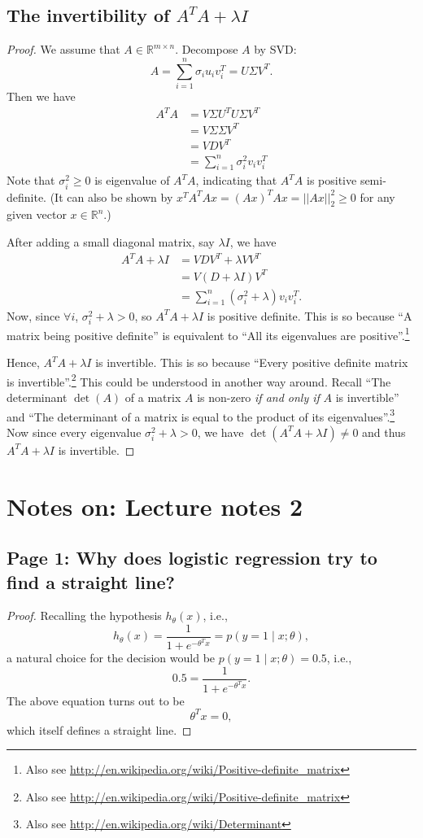 \documentclass{article}
\begin{document}
\subsection{The invertibility of $A^TA+\lambda I$}
\begin{proof}
We assume that $A\in\mathbb{R}^{m\times{n}}$. Decompose $A$ by SVD:
\[
A = \sum_{i=1}^n \sigma_i u_i v_i^T = U\Sigma V^T.
\]
Then we have
\[
\begin{split}
A^T A
&= V\Sigma U^T U\Sigma V^T\\
&= V\Sigma\Sigma V^T\\
&= VDV^T\\
&= \sum_{i=1}^n \sigma_i^2 v_i v_i^T
\end{split}
\]
Note that $\sigma_i^2\geq 0$ is eigenvalue of $A^TA$, indicating that $A^TA$ is positive semi-definite. (It can also be shown by $x^TA^TAx=(Ax)^T Ax=||Ax||_2^2\geq 0$ for any given vector $x\in\mathbb{R}^n$.)

After adding a small diagonal matrix, say $\lambda I$, we have
\[
\begin{split}
A^TA+\lambda I
&= VDV^T + \lambda VV^T\\
&= V(D+\lambda I)V^T\\
&= \sum_{i=1}^n (\sigma_i^2+\lambda) v_i v_i^T.
\end{split}
\]
Now, since $\forall i$, $\sigma_i^2+\lambda>0$, so $A^TA+\lambda I$ is positive definite. This is so because ``A matrix being positive definite'' is equivalent to ``All its eigenvalues are positive''.\footnote{Also see \url{http://en.wikipedia.org/wiki/Positive-definite_matrix}}

Hence, $A^TA+\lambda I$ is invertible. This is so because ``Every positive definite matrix is invertible''.\footnote{Also see \url{http://en.wikipedia.org/wiki/Positive-definite_matrix}} This could be understood in another way around. Recall ``The determinant $\det(A)$ of a matrix $A$ is non-zero \emph{if and only if} $A$ is invertible'' and ``The determinant of a matrix is equal to the product of its eigenvalues''.\footnote{Also see \url{http://en.wikipedia.org/wiki/Determinant}} Now since every eigenvalue $\sigma_i^2+\lambda>0$, we have $\det(A^TA+\lambda I)\neq 0$ and thus $A^TA+\lambda I$ is invertible.
\end{proof}


\section{Notes on: Lecture notes 2}
\subsection{Page 1: Why does logistic regression try to find a straight line?}
\begin{proof}
Recalling the hypothesis $h_{\theta}(x)$, i.e.,
\[
h_{\theta}(x)=\frac{1}{1+e^{-\theta^Tx}}=p(y=1\mid x;\theta),
\]
a natural choice for the decision would be $p(y=1\mid x;\theta)=0.5$, i.e.,
\[
0.5=\frac{1}{1+e^{-\theta^Tx}}.
\]
The above equation turns out to be
\[
\theta^Tx=0,
\]
which itself defines a straight line.
\end{proof}
\end{document}
